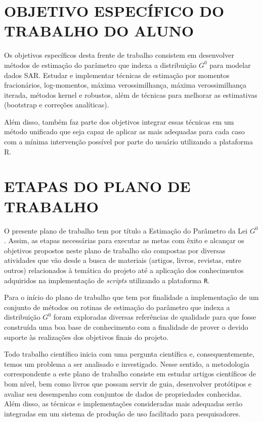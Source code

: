 \documentclass[12pt]{article}
\begin{document}
\newpage
\section*{\centering \textbf{OBJETIVO ESPECÍFICO DO TRABALHO DO ALUNO}}

\vspace{0.5cm}

Os objetivos específicos desta frente de trabalho consistem em desenvolver métodos de estimação do parâmetro que indexa a distribuição $G^{0}$ para modelar dados SAR. Estudar e implementar técnicas de estimação por momentos fracionários, log-momentos, máxima verossimilhança, máxima verossimilhança iterada, métodos kernel e robustos, além de técnicas para melhorar as estimativas (bootstrap e correções analíticas). 

Além disso, também faz parte dos objetivos integrar essas técnicas em um método unificado que seja capaz de aplicar as mais adequadas para cada caso com a mínima intervenção possível por parte do usuário utilizando a plataforma R.

\newpage
\section*{\centering \textbf{ETAPAS DO PLANO DE TRABALHO}}

\vspace{0.5cm}

O presente plano de trabalho tem por título a Estimação do Parâmetro da Lei $G^{0}$. Assim, as etapas necessárias para executar as metas com êxito e alcançar os objetivos propostos neste plano de trabalho são compostas por diversas atividades que vão desde a busca de materiais (artigos, livros, revistas, entre outros) relacionados à temática do projeto até a aplicação dos conhecimentos adquiridos na implementação de \textit{scripts} utilizando a plataforma \texttt{R}. 

Para o início do plano de trabalho que tem por finalidade a implementação de um conjunto de métodos ou rotinas de estimação do parâmetro que indexa a distribuição $G^{0}$ foram exploradas diversas referências de qualidade para que fosse construída uma boa base de conhecimento com a finalidade de prover o devido suporte às realizações dos objetivos finais do projeto.

Todo trabalho científico inicia com uma pergunta científica e, consequentemente, temos um problema a ser analisado e investigado. Nesse sentido, a metodologia correspondente a este plano de trabalho consiste em estudar artigos científicos de bom nível, bem como livros que possam servir de guia, desenvolver protótipos e avaliar seu desempenho com conjuntos de dados de propriedades conhecidas. Além disso, as técnicas e implementações consideradas mais adequadas serão integradas em um sistema de produção de uso facilitado para pesquisadores. 
\end{document}
